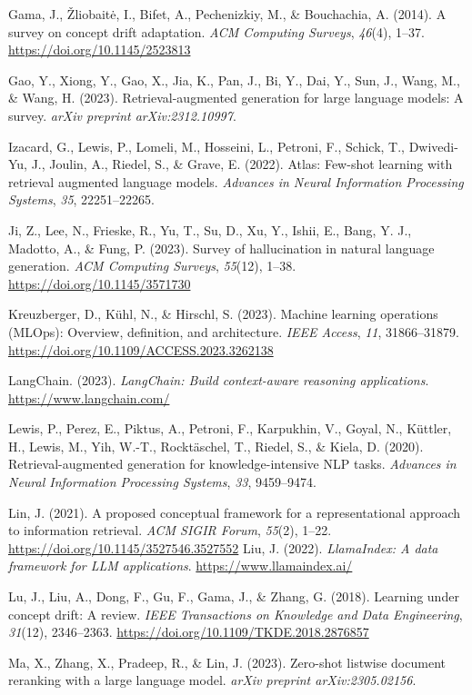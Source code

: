 {Gama, J., \v{Z}liobait\.{e}, I., Bifet, A., Pechenizkiy, M., \& Bouchachia, A. (2014). A survey on concept drift adaptation. \textit{ACM Computing Surveys}, \textit{46}(4), 1--37. \url{https://doi.org/10.1145/2523813}

Gao, Y., Xiong, Y., Gao, X., Jia, K., Pan, J., Bi, Y., Dai, Y., Sun, J., Wang, M., \& Wang, H. (2023). Retrieval-augmented generation for large language models: A survey. \textit{arXiv preprint arXiv:2312.10997}.

Izacard, G., Lewis, P., Lomeli, M., Hosseini, L., Petroni, F., Schick, T., Dwivedi-Yu, J., Joulin, A., Riedel, S., \& Grave, E. (2022). Atlas: Few-shot learning with retrieval augmented language models. \textit{Advances in Neural Information Processing Systems}, \textit{35}, 22251--22265.

Ji, Z., Lee, N., Frieske, R., Yu, T., Su, D., Xu, Y., Ishii, E., Bang, Y. J., Madotto, A., \& Fung, P. (2023). Survey of hallucination in natural language generation. \textit{ACM Computing Surveys}, \textit{55}(12), 1--38. \url{https://doi.org/10.1145/3571730}

Kreuzberger, D., K\"uhl, N., \& Hirschl, S. (2023). Machine learning operations (MLOps): Overview, definition, and architecture. \textit{IEEE Access}, \textit{11}, 31866--31879. \url{https://doi.org/10.1109/ACCESS.2023.3262138}

LangChain. (2023). \textit{LangChain: Build context-aware reasoning applications}. \url{https://www.langchain.com/}

Lewis, P., Perez, E., Piktus, A., Petroni, F., Karpukhin, V., Goyal, N., K{\"u}ttler, H., Lewis, M., Yih, W.-T., Rockt{\"a}schel, T., Riedel, S., \& Kiela, D. (2020). Retrieval-augmented generation for knowledge-intensive NLP tasks. \textit{Advances in Neural Information Processing Systems}, \textit{33}, 9459--9474.

Lin, J. (2021). A proposed conceptual framework for a representational approach to information retrieval. \textit{ACM SIGIR Forum}, \textit{55}(2), 1--22. \url{https://doi.org/10.1145/3527546.3527552}
Liu, J. (2022). \textit{LlamaIndex: A data framework for LLM applications}. \url{https://www.llamaindex.ai/}

Lu, J., Liu, A., Dong, F., Gu, F., Gama, J., \& Zhang, G. (2018). Learning under concept drift: A review. \textit{IEEE Transactions on Knowledge and Data Engineering}, \textit{31}(12), 2346--2363. \url{https://doi.org/10.1109/TKDE.2018.2876857}

Ma, X., Zhang, X., Pradeep, R., \& Lin, J. (2023). Zero-shot listwise document reranking with a large language model. \textit{arXiv preprint arXiv:2305.02156}.

}
